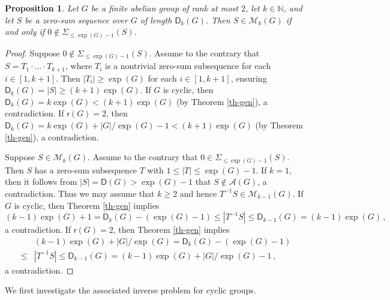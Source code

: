 \documentclass[11pt]{amsart}
\newtheorem{proposition}[theorem]{Proposition}
\theoremstyle{definition}
\newcommand{\N}{\mathbb N}
\numberwithin{equation}{section}
\begin{document}
\begin{proposition}\label{pr-key}
	Let $G$ be a finite abelian group of rank at most $2$, let $k\in \N$, and let $S$ be a zero-sum sequence over $G$ of length $\mathsf D_k(G)$. Then $S\in \mathcal M_k(G)$ if and only if $0\not\in \Sigma_{\le \exp(G)-1}(S)$.
\end{proposition}
\begin{proof}
	Suppose $0\not\in \Sigma_{\le \exp(G)-1}(S)$. Assume to the contrary that $S=T_1\cdot\ldots\cdot T_{k+1}$, where $T_i$ is a nontrivial  zero-sum subsequence for each $i\in [1,k+1]$. Then $|T_i|\ge \exp(G)$ for each $i\in [1,k+1]$, ensuring $\mathsf D_k(G)=|S|\ge (k+1)\exp(G)$. If $G$ is cyclic, then $\mathsf D_k(G)=k\exp(G)<(k+1)\exp(G)$ (by Theorem \ref{th-gen}), a contradiction. If $\mathsf r(G)=2$, then $\mathsf D_k(G)=k\exp(G)+|G|/\exp(G)-1<(k+1)\exp(G)$ (by Theorem \ref{th-gen}), a contradiction.
	
	Suppose $S\in \mathcal M_k(G)$. Assume to the contrary that $0\in \Sigma_{\le \exp(G)-1}(S)$. 
	Then $S$ has a zero-sum subsequence $T$ with $1\le |T|\le \exp(G)-1$. If $k=1$, then it follows from $|S|=\mathsf D(G)>\exp(G)-1$ that $S\not\in \mathcal A(G)$, a contradiction. Thus we may assume that $k\ge 2$ and hence  $T^{-1}S\in \mathcal M_{k-1}(G)$. If $G$ is cyclic, then Theorem \ref{th-gen} implies  $$(k-1)\exp(G)+1= \mathsf D_k(G)-(\exp(G)-1)\le |T^{-1}S|\le \mathsf D_{k-1}(G)=(k-1)\exp(G)\,,$$ a contradiction.
	If $\mathsf r(G)=2$, then Theorem \ref{th-gen} implies
	 \begin{align*} &(k-1)\exp(G)+|G|/\exp(G)= \mathsf D_k(G)-(\exp(G)-1)\\
	 	\le &|T^{-1}S|\le \mathsf D_{k-1}(G)=(k-1)\exp(G)+|G|/\exp(G)-1\,,
	 \end{align*}
	a contradiction.
\end{proof}

We first investigate the associated inverse problem  for cyclic groups.
\end{document}
